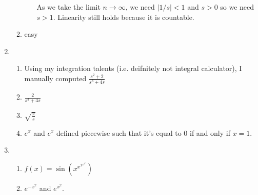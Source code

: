 \documentclass{article}
\begin{document}
\begin{enumerate}
\begin{enumerate}
\begin{enumerate}
            As we take the limit $n\to \infty$, we need $|1/s|<1$ and $s>0$ so we need $s>1.$ Linearity still holds because it is countable.
        \end{enumerate}
        \item easy
    \end{enumerate}
    \item \begin{enumerate}
        \item Using my integration talents (i.e. deifnitely not integral calculator), I manually computed  $\frac{s^2+2}{s^3+4s}$
        \item $\frac{2}{s^3+4s}$
        \item $\sqrt{\frac{\pi}{s}}$
        \item $e^x$ and $e^x$ defined piecewise such that it's equal to $0$ if and only if $x=1$.
    \end{enumerate}
    \item \begin{enumerate}
        \item $f(x)=\sin(x^{x^{x^{x^{x^x}}}})$
        \item $e^{-x^2}$ and $e^{x^2}.$
    \end{enumerate}
\end{enumerate}
\end{document}
